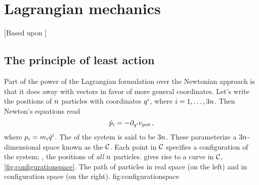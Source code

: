 \chapter{Lagrangian mechanics}
%
[Based upon \citep{tong:2004}]


\section{The principle of least action}
%
Part of the power of the Lagrangian formulation over the Newtonian approach is that it does away with vectors in favor of more general coordinates. Let's write the positions of $n$ particles with coordinates ${q}^{i}$, where $i = 1,\dotsc,3n$. Then Newton's equations read
%
\begin{equation}
  {\dot{p}}_{i} = -\partial_{{q}^{i}}e_\text{pot}\,,
\end{equation}
%
where ${p}_{i} = m_i{\dot{q}}^{i}$. The  of the system is said to be $3n$. These parameterize a $3n$-dimensional space known as the  $\mathcal{C}$. Each point in $\mathcal{C}$ specifies a configuration of the system; \ie, the positions of \emph{all} $n$ particles.  gives rise to a curve in $\mathcal{C}$, \vide \cref{fig:configurationspace}.
%
%
  {The path of particles in real space (on the left) and in configuration space (on the right).}
  {fig:configurationspace}


